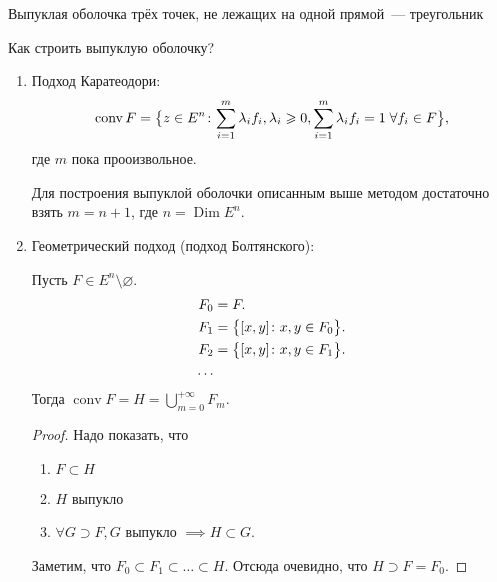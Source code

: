 \begin{exmp}
    Выпуклая оболочка трёх точек, не лежащих на одной прямой~--- треугольник
\end{exmp}

Как строить выпуклую оболочку?
\begin{enumerate}
    \item Подход Каратеодори:
        \begin{equation*}
            \operatorname{conv} F = \bigl\{ z \in E^n\colon {\sum\limits_{i = 1}^{m}\lambda_i f_i}, {\lambda_i \geqslant 0}, {\sum\limits_{i = 1}^{m}\lambda_i f_i = 1} \; {\forall f_i \in F} \bigr\},
        \end{equation*}
        где $m$ пока прооизвольное.
        \begin{namedthm}
            Для построения выпуклой оболочки описанным выше методом достаточно взять $m = n+1$, где $n = \operatorname{Dim} E^n$.
        \end{namedthm}
    \item Геометрический подход (подход Болтянского):
        \begin{thm*}
            Пусть $F \in E^n \setminus \varnothing$.\\
            \begin{align*}
                F_0 &= F.\\
                F_1 &= \bigl\{ [x, y] \colon x, y \in F_0 \bigr\}.\\
                F_2 &= \bigl\{ [x, y] \colon x, y \in F_1 \bigr\}.\\
                \ldots \\
            \end{align*}
            Тогда
            $\operatorname{conv} F = H = \bigcup\limits_{m = 0}^{+\infty} F_m$.

        \end{thm*}
        \begin{proof}
            Надо показать, что 
            \begin{enumerate}
                \item $F \subset H$
                \item $H$ выпукло
                \item $\forall G \supset F, G$ выпукло $\implies H \subset G$.
            \end{enumerate}
            
            Заметим, что $F_0 \subset F_1 \subset \ldots \subset H$.
            Отсюда очевидно, что $H \supset F = F_0$.


\end{proof}
\end{enumerate}
